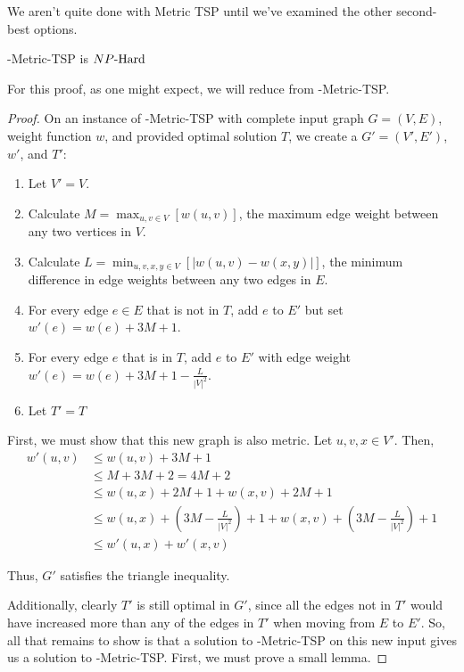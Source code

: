 We aren't quite done with Metric TSP until we've examined the other second-best options.
\begin{theorem}
    \exob{}-Metric-TSP is ${NP\text{-Hard{}}}$
\end{theorem}
For this proof, as one might expect, we will reduce from \inob{}-Metric-TSP.
\begin{proof}
    On an instance of \inob{}-Metric-TSP with complete input graph $G = (V,E)$, weight function $w$, and provided optimal solution $T$, we create a $G' = (V',E')$, $w'$, and $T'$:
    \begin{enumerate}
        \item Let $V' = V$.
        \item Calculate $M = \max_{u,v\in V}[w(u,v)]$, the maximum edge weight between any two vertices in $V$.
        \item Calculate $L = \min_{u,v,x,y\in V}[|w(u,v) - w(x,y)|]$, the minimum difference in edge weights between any two edges in $E$.
        \item For every edge $e \in E$ that is not in $T$, add $e$ to $E'$ but set $w'(e) = w(e) + 3M + 1$. 
        \item For every edge $e$ that is in $T$, add $e$ to $E'$ with edge weight $w'(e) = w(e) + 3M + 1 - \frac{L}{|V|^2}$.
        \item Let $T' = T$
    \end{enumerate}
    
    First, we must show that this new graph is also metric. Let $u,v,x \in V'$. Then,     
    \begin{equation*}
    \begin{split}
              w'(u,v) &\leq w(u,v) + 3M + 1  \\
        &\leq M + 3M + 2  = 4M + 2 \\
        &\leq w(u,x) + 2M + 1 + w(x,v) + 2M + 1\\
        &\leq w(u,x) + (3M- \frac{L}{|V|^2}) + 1 + w(x,v) + (3M- \frac{L}{|V|^2}) + 1 \\
        &\leq w'(u,x) + w'(x,v)
    \end{split}
    \end{equation*}
    
    Thus, $G'$ satisfies the triangle inequality.
    
    Additionally, clearly $T'$ is still optimal in $G'$, since all the edges not in $T'$ would have increased more than any of the edges in $T'$ when moving from $E$ to $E'$. So, all that remains to show is that a solution to \exob{}-Metric-TSP on this new input gives us a solution to \inob{}-Metric-TSP. First, we must prove a small lemma.


\end{proof}
